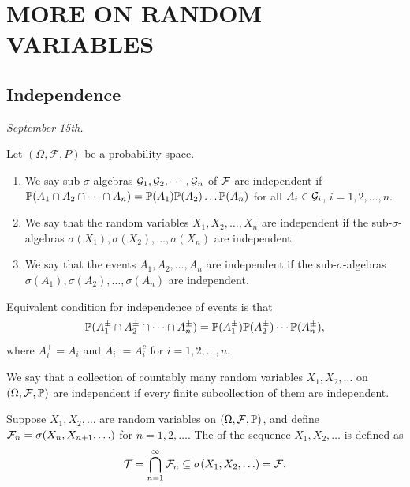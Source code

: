 \chapter{MORE ON RANDOM VARIABLES}

\section{Independence}
\textit{September 15th.}

\begin{definition}
    Let $(\Omega, \mathcal{F}, P)$ be a probability space.
    \begin{enumerate}
        \item We say sub-$\sigma$-algebras $\mathcal{G}_{1},\mathcal{G}_{2},\cdots,\mathcal{G}_{n}$ of $\mathcal{F}$ are independent if $\mathbb{P}(A_{1} \cap A_{2} \cap \cdots \cap A_{n}) = \mathbb{P}(A_{1})\mathbb{P}(A_{2})\ldots\mathbb{P}(A_{n})$ for all $A_{i} \in \mathcal{G}_{i}$, $i=1,2,\ldots,n$.
        \item We say that the random variables $X_{1},X_{2},\ldots,X_{n}$ are independent if the sub-$\sigma$-algebras $\sigma(X_{1}),\sigma(X_{2}),\ldots,\sigma(X_{n})$ are independent.
        \item We say that the events $A_{1},A_{2},\ldots,A_{n}$ are independent if the sub-$\sigma$-algebras $\sigma(A_{1}),\sigma(A_{2}),\ldots,\sigma(A_{n})$ are independent.
    \end{enumerate}
\end{definition}

Equivalent condition for independence of events is that
\begin{align}
    \mathbb{P}(A_{1}^{\pm} \cap A_{2}^{\pm} \cap \cdots \cap A_{n}^{\pm}) = \mathbb{P}(A_{1}^{\pm})\mathbb{P}(A_{2}^{\pm})\cdots\mathbb{P}(A_{n}^{\pm}),
\end{align}
where $A_{i}^{+} = A_{i}$ and $A_{i}^{-} = A_{i}^{c}$ for $i=1,2,\ldots,n$.
\begin{definition}
    We say that a collection of countably many random variables $X_{1},X_{2},\ldots$ on $(\Omega,\mathcal{F},\mathbb{P})$ are independent if every finite subcollection of them are independent. 
\end{definition}

\begin{definition}
    Suppose $X_{1},X_{2},\ldots$ are random variables on $(\Omega,\mathcal{F},\mathbb{P})$, and define $\mathcal{F}_{n} = \sigma(X_{n},X_{n+1},\ldots)$ for $n=1,2,\ldots$. The  of the sequence $X_{1},X_{2},\ldots$ is defined as
    \begin{align}
        \mathcal{T} = \bigcap_{n=1}^{\infty} \mathcal{F}_{n} \subseteq \sigma(X_{1},X_{2},\ldots) = \mathcal{F}.
    \end{align}
\end{definition}

